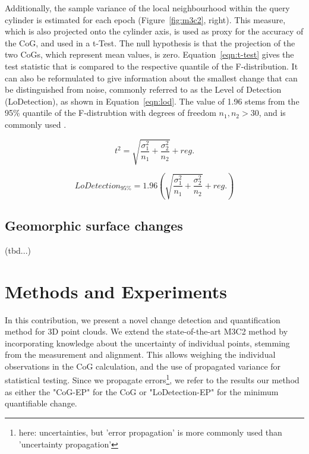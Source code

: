 \documentclass[preprint,12pt,3p]{elsarticle}
\begin{document}
Additionally, the sample variance of the local neighbourhood within the query cylinder is estimated for each epoch (Figure~\ref{fig:m3c2}, right). This measure, which is also projected onto the cylinder axis, is used as proxy for the accuracy of the CoG, and used in a t-Test. The null hypothesis is that the projection of the two CoGs, which represent mean values, is zero. Equation~\ref{eqn:t-test} gives the test statistic that is compared to the respective quantile of the F-distribution. It can also be reformulated to give information about the smallest change that can be distinguished from noise, commonly referred to as the Level of Detection (LoDetection), as shown in Equation~\ref{eqn:lod}. The value of 1.96 stems from the 95\% quantile of the F-distrubtion with degrees of freedom $n_1, n_2 > 30$, and is commonly used \citep{borradaile2003statistics}.

\begin{equation}
    t^2 = \sqrt{\frac{\sigma_1^2}{n_1} + \frac{\sigma_2^2}{n_2}} + reg.
    \label{eqn:t-test}
\end{equation}

\begin{equation}
    LoDetection_{95\%} = 1.96 \left( \sqrt{\frac{\sigma_1^2}{n_1} + \frac{\sigma_2^2}{n_2}} + reg. \right)
    \label{eqn:lod}
\end{equation}


\subsection{Geomorphic surface changes}
(tbd...) 

\section{Methods and Experiments}
\label{sec:methods}

In this contribution, we present a novel change detection and quantification method for 3D point clouds. We extend the state-of-the-art M3C2 method by incorporating knowledge about the uncertainty of individual points, stemming from the measurement and alignment. This allows weighing the individual observations in the CoG calculation, and the use of propagated variance for statistical testing. Since we propagate errors\footnote{here: uncertainties, but 'error propagation' is more commonly used than 'uncertainty propagation'}, we refer to the results our method as either the "CoG-EP" for the CoG or "LoDetection-EP" for the minimum quantifiable change.
\end{document}
